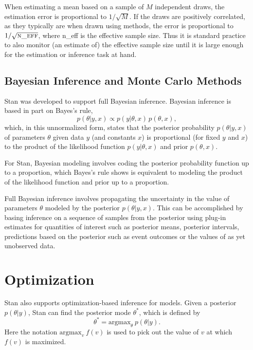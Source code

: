 When estimating a mean based on a sample of $M$ independent draws, the
estimation error is proportional to $1/\sqrt{M}$.  If the draws are
positively correlated, as they typically are when drawn using \MCMC
methods, the error is proportional to $1/\sqrt{\mbox{\sc n\_eff}}$,
where {\sc n\_eff} is the effective sample size.  Thus it is standard
practice to also monitor (an estimate of) the effective sample size
until it is large enough for the estimation or inference task at
hand.

\subsection{Bayesian Inference and Monte Carlo Methods}

Stan was developed to support full Bayesian inference.  Bayesian
inference is based in part on Bayes's rule,
\[
p(\theta|y,x) \propto p(y|\theta,x) \, p(\theta,x),
\]
which, in this unnormalized form, states that the posterior
probability $p(\theta|y,x)$ of parameters $\theta$ given data $y$ (and
constants $x$) is proportional (for fixed $y$ and $x$) to the
product of the likelihood function $p(y|\theta,x)$ and prior
$p(\theta,x)$.

For Stan, Bayesian modeling involves coding the posterior probability
function up to a proportion, which Bayes's rule shows is equivalent to
modeling the product of the likelihood function and prior up to a
proportion.

Full Bayesian inference involves propagating the uncertainty in the
value of parameters $\theta$ modeled by the posterior $p(\theta|y,x)$.
This can be accomplished by basing inference on a sequence of samples
from the posterior using plug-in estimates for quantities of interest
such as posterior means, posterior intervals, predictions based on the
posterior such as event outcomes or the values of as yet unobserved
data.



\section{Optimization}

Stan also supports optimization-based inference for models.  Given a
posterior $p(\theta|y)$, Stan can find the posterior mode $\theta^*$,
which is defined by
%
\[
\theta^{*} = \mbox{argmax}_{\theta} \ p(\theta|y).
\]
%
Here the notation $\mbox{argmax}_v \ f(v)$ is used to pick out the value
of $v$ at which $f(v)$ is maximized.

